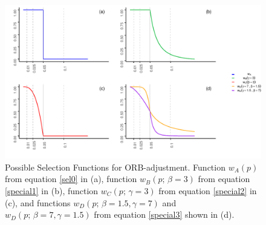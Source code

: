 \documentclass[twocolumn]{article}\usepackage[]{graphicx}\usepackage[]{xcolor}
\makeatletter
\def\maxwidth{ %
  \ifdim\Gin@nat@width>\linewidth
    \linewidth
  \else
    \Gin@nat@width
  \fi
}
\makeatother
\begin{document}
\begin{figure}[!hbt]
\centering
\caption{Possible Selection Functions for ORB-adjustment. Function $w_A(p)$ from equation \eqref{sel0} in (a), function $w_B(p \text{; } \beta = 3)$ from equation \eqref{special1} in (b), function $w_C(p \text{; } \gamma = 3)$ from equation \eqref{special2} in (c), and functions $w_D(p \text{; } \beta = 1.5, \gamma = 7)$ and $w_D(p \text{; } \beta = 7, \gamma = 1.5)$  from equation \eqref{special3} shown in (d).\\[0.5em]}


{\centering \includegraphics[width=\maxwidth]{figures/plots-unnamed-chunk-1-1} 

}



\label{new.weight.fig}
\end{figure}














\end{document}
